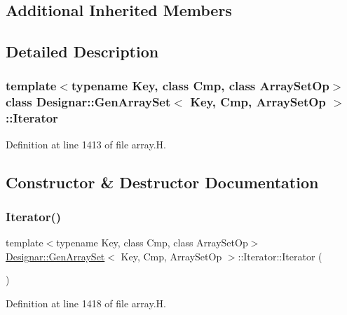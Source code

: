 \subsection*{Additional Inherited Members}


\subsection{Detailed Description}
\subsubsection*{template$<$typename Key, class Cmp, class Array\+Set\+Op$>$\newline
class Designar\+::\+Gen\+Array\+Set$<$ Key, Cmp, Array\+Set\+Op $>$\+::\+Iterator}



Definition at line 1413 of file array.\+H.



\subsection{Constructor \& Destructor Documentation}
\mbox{\label{class_designar_1_1_gen_array_set_1_1_iterator_a9f4aba730b697c071ffc51ef70db48ce}} 
\subsubsection{\texorpdfstring{Iterator()}{Iterator()}\hspace{0.1cm}{\footnotesize\ttfamily [1/5]}}
{\footnotesize\ttfamily template$<$typename Key, class Cmp, class Array\+Set\+Op$>$ \\
\hyperlink{class_designar_1_1_gen_array_set}{Designar\+::\+Gen\+Array\+Set}$<$ Key, Cmp, Array\+Set\+Op $>$\+::Iterator\+::\+Iterator (\begin{DoxyParamCaption}{ }\end{DoxyParamCaption})\hspace{0.3cm}{\ttfamily [inline]}}



Definition at line 1418 of file array.\+H.

\mbox{\label{class_designar_1_1_gen_array_set_1_1_iterator_ae7870668057c79aefda6001548c550f1}} 
